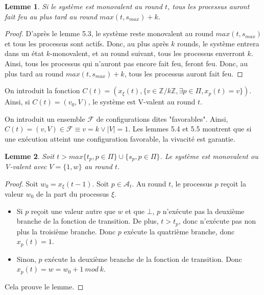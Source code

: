 \documentclass{article}
\newtheorem{lemma}{Lemme}[section]
\begin{document}
\begin{lemma}
	Si le système est monovalent au round $t$, tous les processus auront fait feu au plus tard au round $max(t, s_{max})+k$.
\end{lemma}
\begin{proof}
	D'après le lemme 5.3, le système reste monovalent au round $max(t, s_{max})$ et tous les processus sont actifs.
	Donc, au plus après $k$ rounds, le système entrera dans un état $k$-monovalent, et au round suivant, tous les processus enverront $k$.
	Ainsi, tous les processus qui n'auront pas encore fait feu, feront feu.
	Donc, au plus tard au round $max(t, s_{max})+k$, tous les processus auront fait feu.
\end{proof}

On introduit la fonction $C(t) = (x_\xi(t), \{v \in \mathds{Z}/k\mathds{Z}, \exists p \in \Pi, x_p(t) = v\})$.
Ainsi, si $C(t) = (v_0, V)$, le système est V-valent au round $t$.

On introduit un ensemble $\mathcal{F}$ de configurations dites "favorables".
Ainsi, $C(t) = (v, V) \in \mathcal{F} \equiv v = k \vee |V| = 1$.
Les lemmes 5.4 et 5.5 montrent que si une exécution atteint une configuration favorable, la vivacité est garantie.


\begin{lemma}
	Soit $t > max \{t_p, p \in \Pi\} \cup \{s_p, p \in \Pi\}$. Le système est monovalent ou V-valent avec $V = \{1, w\}$ au round $t$.
\end{lemma}
\begin{proof}
	Soit $w_0 = x_\xi(t-1)$. Soit $p \in \mathcal{A}_t$.
	Au round $t$, le processus $p$ reçoit la valeur $w_0$ de la part du processus $\xi$.
	\begin{itemize}
		\item Si $p$ reçoit une valeur autre que $w$ et que $\bot$,
			$p$ n'exécute pas la deuxième branche de la fonction de transition. De plus, $t > t_p$, donc n'exécute pas non plus la troisième branche.
			Donc $p$ exécute la quatrième branche, donc $x_p(t) = 1$.
		\item Sinon, $p$ exécute la deuxième branche de la fonction de transition. Donc $x_p(t) = w = w_0+1~mod~k$.
	\end{itemize}

	Cela prouve le lemme.
\end{proof}
\end{document}
